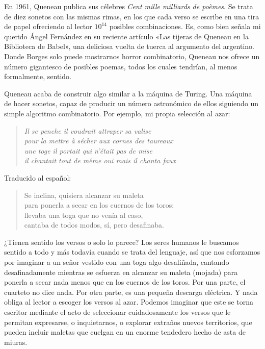 \documentclass[11pt,a4paper]{article}
\begin{document}
En 1961, Queneau publica sus célebres
\emph{Cent mille milliards de poèmes}. Se trata de diez sonetos con las mismas rimas, en los que cada verso se escribe en una tira de papel ofreciendo al lector $10^{14}$ posibles combinaciones. Es, como bien señala mi querido Ángel Fernández en su reciente artículo «Las tijeras de Queneau en la Biblioteca de Babel», una deliciosa vuelta de tuerca al argumento del argentino. Donde Borges solo puede mostrarnos horror combinatorio, Queneau nos ofrece un número gigantesco de posibles poemas, todos los cuales tendrían, al menos formalmente, sentido.

Queneau acaba de construir algo similar a la máquina de Turing. Una máquina de hacer sonetos, capaz de producir un número astronómico de ellos siguiendo un simple algoritmo combinatorio. Por ejemplo, mi propia selección al azar: 


\begin{verse}
\itshape
Il se penche il voudrait attraper sa valise\\
pour la mettre à sécher aux cornes des taureaux\\
une toge il portait qui n’était pas de mise\\
il chantait tout de même oui mais il chanta faux
\end{verse}

Traducido al español:

\begin{verse}
Se inclina, quisiera alcanzar su maleta\\
para ponerla a secar en los cuernos de los toros;\\
llevaba una toga que no venía al caso,\\
cantaba de todos modos, sí, pero desafinaba.
\end{verse}

¿Tienen sentido los versos o solo lo parece? Los seres humanos le buscamos sentido a todo y más todavía cuando se trata del lenguaje, así que nos esforzamos por imaginar a un señor vestido con una toga algo desaliñada, cantando desafinadamente mientras se esfuerza en alcanzar su maleta (mojada) para ponerla a secar nada menos que en los cuernos de los toros. Por una parte, el cuarteto no dice nada. Por otra parte, es una pequeña descarga eléctrica. Y nada obliga al lector a escoger los versos al azar. Podemos imaginar que este se torna escritor mediante el acto de seleccionar cuidadosamente los versos que le permitan expresarse, o inquietarnos, o explorar extraños nuevos territorios, que pueden incluir maletas que cuelgan en un enorme tendedero hecho de asta de miuras. 
\end{document}
